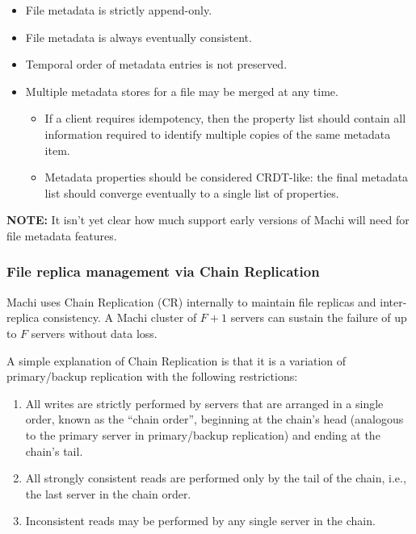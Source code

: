 \documentclass[preprint,10pt]{sigplanconf}
\begin{document}
\begin{itemize}
    \item File metadata is strictly append-only.
    \item File metadata is always eventually consistent.
    \item Temporal order of metadata entries is not preserved.
    \item Multiple metadata stores for a file may be merged at any time.
    \begin{itemize}
        \item If a client requires idempotency, then the property list
          should contain all information required to identify multiple
          copies of the same metadata item.
        \item Metadata properties should be considered CRDT-like: the
          final metadata list should converge eventually to a single
          list of properties. 
    \end{itemize}
\end{itemize}

{\bf NOTE:} It isn't yet clear how much support early versions of
Machi will need for file metadata features.

\subsubsection{File replica management via Chain Replication}
\label{sub:chain-replication}

Machi uses Chain Replication (CR) internally to maintain file
replicas and inter-replica consistency.
A Machi cluster of $F+1$ servers can sustain the failure of up
to $F$ servers without data loss.

A simple explanation of Chain Replication is that it is a variation of
primary/backup replication with the following
restrictions:

\begin{enumerate}
\item All writes are strictly performed by servers that are arranged
  in a single order, known as the ``chain order'', beginning at the
  chain's head (analogous to the primary server in primary/backup
  replication) and ending at the chain's tail.
\item All strongly consistent reads are performed only by the tail of
  the chain, i.e., the last server in the chain order.
\item Inconsistent reads may be performed by any single server in the
  chain.
\end{enumerate}
\end{document}
